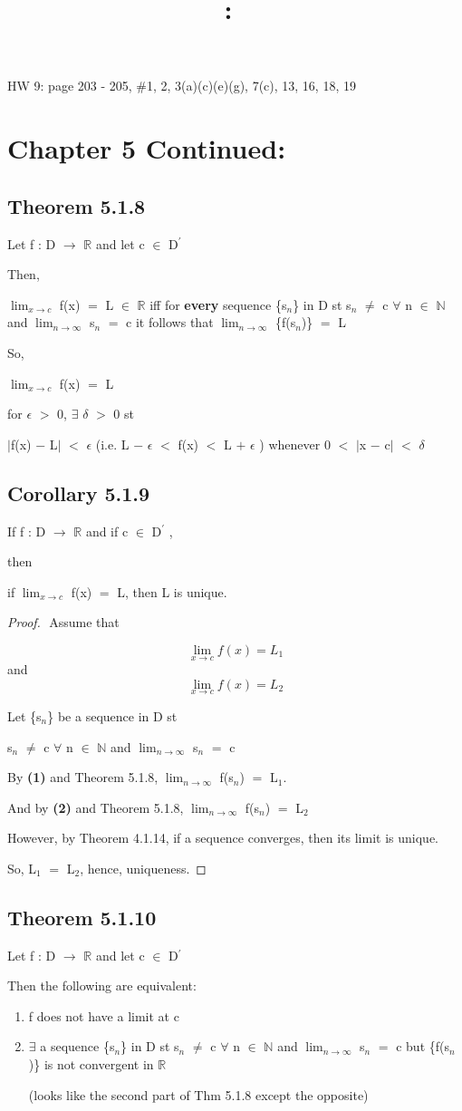 \documentclass{article}
\title{
    \vspace{2in}
    \textmd{\textbf{\hmwkClass:\ \hmwkTitle}}\\
    \normalsize\vspace{0.1in}\small\vspace{0.1in}\large{\textit{\hmwkClassInstructor}}
    \vspace{3in}
}
\author{\hmwkAuthorName}
\date{}
\newcommand{\mt}[1]{\ensuremath{#1}}
\newcommand\bsc[2][\DefaultOpt]{%
  \def\DefaultOpt{#2}%
  \section[#1]{#2}%
}
\newcommand\ssc[2][\DefaultOpt]{%
  \def\DefaultOpt{#2}%
  \subsection[#1]{#2}%
}
\newcommand{\bgpf}{\begin{proof} $ $\newline}
\newcommand{\balist}{\begin{enumerate}[label=\alph*.]}
\newcommand{\elist}{\end{enumerate}}
\newcommand{\bpth}[1]{\textbf{(#1)}}
\newcommand{\step}[2]{\begin{equation}\tag{#2}#1\end{equation}}
\newcommand{\epf}{\end{proof}}
\newcommand{\br}{\mt{\mathbb{R}} }       %
\newcommand{\bn}{\mt{\mathbb{N}} }       %
\newcommand{\ep}{\mt{\epsilon} }         %
\newcommand{\fa}{\mt{\forall} }          %
\newcommand{\mem}{\mt{\in} }
\newcommand{\exs}{\mt{\exists} }
\newcommand{\lra}{ \mt{\longrightarrow} } %
\newcommand{\av}[1]{\mt{|}#1\mt{|}}  %
\newcommand{\bk}[1]{\{#1\}}
\newcommand{\ps}{\mt{+} }
\newcommand{\ms}{\mt{-} }
\newcommand{\ls}{\mt{<} }
\newcommand{\gr}{\mt{>} }
\newcommand{\eql}{\mt{=} }
\newcommand{\pr}{\mt{^\prime} } 		   %
\newcommand{\uw}[2]{#1\mt{_{#2}}}
\newcommand{\lmti}[1]{\mt{\displaystyle{\lim_{#1 \to \infty}}}}
\newcommand{\limt}[2]{\mt{\displaystyle{\lim_{#1 \to #2}}}}
\begin{document}
HW 9: page 203 - 205, \#1, 2, 3(a)(c)(e)(g), 7(c), 13, 16, 18, 19

\bsc{Chapter 5 Continued:}{
\ssc{Theorem 5.1.8}{

Let f : D \lra \br and let c \mem D\pr

Then,

\limt{x}{c} f(x) \eql L \mem \br iff for \textbf{every} sequence \bk{\uw{s}{n}} in D st \uw{s}{n} $\neq$ c \fa n \mem \bn and \lmti{n} \uw{s}{n} \eql c it follows that \lmti{n} \bk{f(\uw{s}{n})} \eql L

So,

\limt{x}{c} f(x) \eql L

for \ep \gr 0, \exs $\delta$ \gr 0 st

\av{f(x) \ms L} \ls \ep (i.e. L \ms \ep \ls f(x) \ls L \ps \ep) whenever 0 \ls \av{x	 \ms c} \ls $\delta$
}

\ssc{Corollary 5.1.9}{

If f : D \lra \br and if c \mem D\pr,

then

if \limt{x}{c} f(x) \eql L, then L is unique.

\bgpf
Assume that

\step{\limt{x}{c} f(x) = L_1}{1}
and
\step{\limt{x}{c} f(x) = L_2}{2}

Let \bk{\uw{s}{n}} be a sequence in D st

\uw{s}{n} $\neq$ c \fa n \mem \bn and \lmti{n} \uw{s}{n} \eql c

By \bpth{1} and Theorem 5.1.8, \lmti{n} f(\uw{s}{n}) \eql \uw{L}{1}.

And by \bpth{2} and Theorem 5.1.8, \lmti{n} f(\uw{s}{n}) \eql \uw{L}{2}

However, by Theorem 4.1.14, if a sequence converges, then its limit is unique.

So, \uw{L}{1} \eql \uw{L}{2}, hence, uniqueness.
\epf

}

\ssc{Theorem 5.1.10}{

Let f : D \lra \br and let c \mem D\pr

Then the following are equivalent:

\balist
\item f does not have a limit at c
\item \exs a sequence \bk{\uw{s}{n}} in D st \uw{s}{n} $\neq$ c \fa n \mem \bn and \lmti{n} \uw{s}{n} \eql c but \bk{f(\uw{s}{n})} is not convergent in \br

	(looks like the second part of Thm 5.1.8 except the opposite)
\elist

}}
\end{document}
